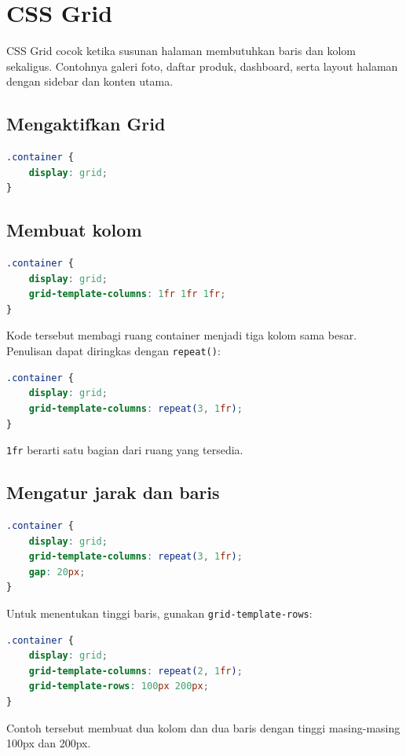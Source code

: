 \documentclass[11pt,a4paper]{article}
\begin{document}
\section{CSS Grid}
CSS Grid cocok ketika susunan halaman membutuhkan baris dan kolom sekaligus. Contohnya galeri foto, daftar produk, dashboard, serta layout halaman dengan sidebar dan konten utama.
\subsection{Mengaktifkan Grid}
\begin{lstlisting}[language=CSS]
.container {
    display: grid;
}
\end{lstlisting}
\subsection{Membuat kolom}
\begin{lstlisting}[language=CSS]
.container {
    display: grid;
    grid-template-columns: 1fr 1fr 1fr;
}
\end{lstlisting}
Kode tersebut membagi ruang container menjadi tiga kolom sama besar. Penulisan dapat diringkas dengan \texttt{repeat()}:
\begin{lstlisting}[language=CSS]
.container {
    display: grid;
    grid-template-columns: repeat(3, 1fr);
}
\end{lstlisting}
\texttt{1fr} berarti satu bagian dari ruang yang tersedia.
\subsection{Mengatur jarak dan baris}
\begin{lstlisting}[language=CSS]
.container {
    display: grid;
    grid-template-columns: repeat(3, 1fr);
    gap: 20px;
}
\end{lstlisting}
Untuk menentukan tinggi baris, gunakan \texttt{grid-template-rows}:
\begin{lstlisting}[language=CSS]
.container {
    display: grid;
    grid-template-columns: repeat(2, 1fr);
    grid-template-rows: 100px 200px;
}
\end{lstlisting}
Contoh tersebut membuat dua kolom dan dua baris dengan tinggi masing-masing 100px dan 200px.
\end{document}
